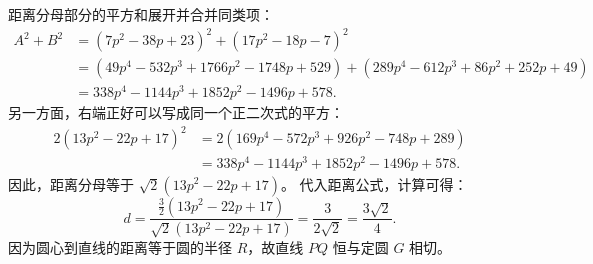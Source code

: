 \begin{solution}
距离分母部分的平方和展开并合并同类项：
\begin{align*}
A^2 + B^2 &= (7p^2 - 38p + 23)^2 + (17p^2 - 18p - 7)^2 \\
&= (49p^4 - 532p^3 + 1766p^2 - 1748p + 529) + (289p^4 - 612p^3 + 86p^2 + 252p + 49) \\
&= 338p^4 - 1144p^3 + 1852p^2 - 1496p + 578.
\end{align*}
另一方面，右端正好可以写成同一个正二次式的平方：
\begin{align*}
2(13p^2 - 22p + 17)^2 &= 2(169p^4 - 572p^3 + 926p^2 - 748p + 289) \\
&= 338p^4 - 1144p^3 + 1852p^2 - 1496p + 578.
\end{align*}
因此，距离分母等于 $\sqrt{2}(13p^2 - 22p + 17)$。
代入距离公式，计算可得：
\[ d = \frac{\frac{3}{2}(13p^2 - 22p + 17)}{\sqrt{2}(13p^2 - 22p + 17)} = \frac{3}{2\sqrt{2}} = \frac{3\sqrt{2}}{4}. \]
因为圆心到直线的距离等于圆的半径 $R$，故直线 $PQ$ 恒与定圆 $G$ 相切。

\end{solution}



